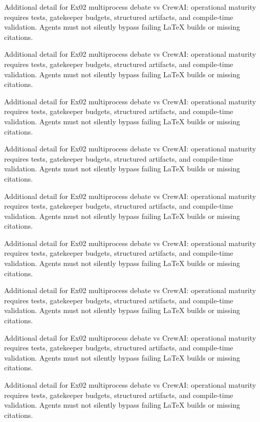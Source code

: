 Additional detail for Ex02 multiprocess debate vs CrewAI: operational maturity requires tests, gatekeeper budgets, structured artifacts, and compile-time validation. Agents must not silently bypass failing LaTeX builds or missing citations. \cite{crewai2024} \cite{langgraph2024}

Additional detail for Ex02 multiprocess debate vs CrewAI: operational maturity requires tests, gatekeeper budgets, structured artifacts, and compile-time validation. Agents must not silently bypass failing LaTeX builds or missing citations. \cite{crewai2024} \cite{langgraph2024}

Additional detail for Ex02 multiprocess debate vs CrewAI: operational maturity requires tests, gatekeeper budgets, structured artifacts, and compile-time validation. Agents must not silently bypass failing LaTeX builds or missing citations. \cite{crewai2024} \cite{langgraph2024}

Additional detail for Ex02 multiprocess debate vs CrewAI: operational maturity requires tests, gatekeeper budgets, structured artifacts, and compile-time validation. Agents must not silently bypass failing LaTeX builds or missing citations. \cite{crewai2024} \cite{langgraph2024}

Additional detail for Ex02 multiprocess debate vs CrewAI: operational maturity requires tests, gatekeeper budgets, structured artifacts, and compile-time validation. Agents must not silently bypass failing LaTeX builds or missing citations. \cite{crewai2024} \cite{langgraph2024}

Additional detail for Ex02 multiprocess debate vs CrewAI: operational maturity requires tests, gatekeeper budgets, structured artifacts, and compile-time validation. Agents must not silently bypass failing LaTeX builds or missing citations. \cite{crewai2024} \cite{langgraph2024}

Additional detail for Ex02 multiprocess debate vs CrewAI: operational maturity requires tests, gatekeeper budgets, structured artifacts, and compile-time validation. Agents must not silently bypass failing LaTeX builds or missing citations. \cite{crewai2024} \cite{langgraph2024}

Additional detail for Ex02 multiprocess debate vs CrewAI: operational maturity requires tests, gatekeeper budgets, structured artifacts, and compile-time validation. Agents must not silently bypass failing LaTeX builds or missing citations. \cite{crewai2024} \cite{langgraph2024}

Additional detail for Ex02 multiprocess debate vs CrewAI: operational maturity requires tests, gatekeeper budgets, structured artifacts, and compile-time validation. Agents must not silently bypass failing LaTeX builds or missing citations. \cite{crewai2024} \cite{langgraph2024}

